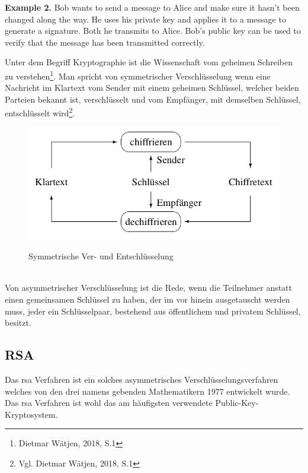 {	\textbf{Example 2.} Bob wants to send a message to Alice and make sure it hasn't been changed along the way. He uses his private key and applies it to a message to generate a signature. Both he transmits to Alice. Bob's public key can be used to verify that the message has been transmitted correctly.
}{
	\glqq Unter dem Begriff Kryptographie ist die Wissenschaft vom geheimen Schreiben zu verstehen\grqq\footnote{Dietmar Wätjen, 2018, S.1}. Man spricht von symmetrischer Verschlüsselung wenn eine Nachricht im Klartext vom Sender mit einem geheimen Schlüssel, welcher beiden Parteien bekannt ist, verschlüsselt und vom Empfänger, mit demselben Schlüssel, entschlüsselt wird\footnote{Vgl. Dietmar Wätjen, 2018, S.1}.\\
	\begin{figure}[h]
		\begin{minipage}{\textwidth}
			\centering
			\includegraphics[scale=0.5]{figures/ver-und-entschluesseln.png}
			\label{fig:ver-und-entschluesselung}
			\caption{Symmetrische Ver- und Entschlüsselung}
		\end{minipage}
	\end{figure}\\
	Von asymmetrischer Verschlüsselung ist die Rede, wenn die Teilnehmer anstatt einen gemeinsamen Schlüssel zu haben, der im vor hinein ausgetauscht werden muss, jeder ein Schlüsselpaar, bestehend aus öffentlichem und privatem Schlüssel, besitzt.\\
	
	\subsection{RSA}
	Das \gls{rsa} Verfahren ist ein solches asymmetrisches Verschlüsselungsverfahren welches von den drei namens gebenden Mathematikern 1977 entwickelt wurde. Das \gls{rsa} Verfahren ist wohl das am häufigsten verwendete Public-Key-Kryptosystem.\\
	
}
